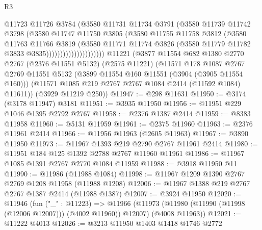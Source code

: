 \begin{lexlean}{R3}
\begin{coremodule}
                                @11723
                                @11726
                                @3784
                                (@3580
                                  @11731
                                  @11734
                                  @3791
                                  (@3580
                                    @11739
                                    @11742
                                    @3798
                                    (@3580
                                      @11747
                                      @11750
                                      @3805
                                      (@3580
                                        @11755
                                        @11758
                                        @3812
                                        (@3580
                                          @11763
                                          @11766
                                          @3819
                                          (@3580
                                            @11771
                                            @11774
                                            @3826
                                            (@3580 @11779 @11782 @3833 @3835)))))))))))))))))))))
    @11221
    (@3877
      @11554
      @682
      @1380
      @2770
      @2767
      (@2376 @11551 @5132)
      (@2575 @11221)
      (@11571
        @178
        @1087
        @2767
        @2769
        @11551
        @5132
        (@3899 @11554 @160 @11551 (@3904 (@3905 @11554 @160)))
        (@11571 @1085 @219 @2767 @2767 @1084 @2414 (@11592 @1084) @11611))
      (@3929 @11219 @250))
@11947 := @298 @11631
@11950 := @3174 (@3178 @11947) @3181
@11951 := @3935 @11950
@11956 := @11951 @229 @1046 @1395 @2792 @2767
@11958 := @2376 @1387 @2414
@11959 := @8383 @11958
@11960 := @5131 @11959
@11961 := @2375 @11960
@11963 := @2376 @11961 @2414
@11966 := @11956 @11963 (@2605 @11963)
@11967 := @3890 @11950
@11973 := @11967 @1393 @219 @2790 @2767 @11961 @2414
@11980 := @11951 @184 @125 @1392 @2788 @2767 @11960 @11961
@11986 := @11967 @1085 @1391 @2767 @2770 @1084 @11959
@11988 := @3918 @11950 @11
@11990 := @11986 (@11988 @1084)
@11998 := @11967 @1209 @1390 @2767 @2769 @1208 @11958 (@11988 @1208)
@12006 := @11967 @1388 @219 @2767 @2767 @1387 @2414 (@11988 @1387)
@12007 := @3924 @11950
@12020 := @11946
    (fun ("_" : @11223) =>
    @11966 (@11973 (@11980 (@11990 (@11998 (@12006 @12007))) (@4002 @11960)) @12007) (@4008 @11963))
@12021 := @11222 @4013
@12026 := @3213 @11950 @1403 @1418 @1746 @2772

\end{coremodule}
\end{lexlean}
